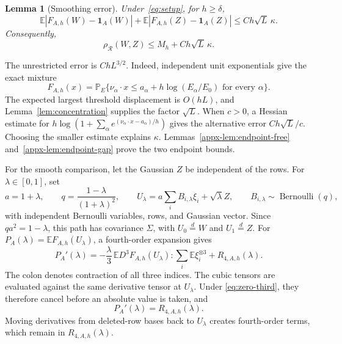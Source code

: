 \documentclass[11pt,letterpaper]{article}
\newtheorem{lemma}{Lemma}
\theoremstyle{remark}
\newcommand{\E}{\mathbb E}
\newcommand{\Pp}{\mathbb P}
\newcommand{\rh}{\rho_{\mathcal R}}
\newcommand{\ind}{\mathbf 1}
\begin{document}
\begin{lemma}[Smoothing error]\label{lem:endpoint}
Under~\eqref{eq:setup}, for \(h\ge\delta\),
\begin{equation}
 \E|F_{A,h}(W)-\ind_A(W)|+
 \E|F_{A,h}(Z)-\ind_A(Z)|\le Ch\sqrt L\,\kappa.
 \label{eq:endpoint-error}
\end{equation}
Consequently,
\begin{equation}
 \rh(W,Z)\le M_h+Ch\sqrt L\,\kappa.
 \label{eq:endpoint-min}
\end{equation}
\end{lemma}
The unrestricted error is \(ChL^{3/2}\). Indeed, independent unit
exponentials give the exact mixture
\[
 F_{A,h}(x)=\Pp_E\{\nu_\alpha\cdot x\le
 a_\alpha+h\log(E_\alpha/E_0)\text{ for every }\alpha\}.
\]
The expected largest threshold displacement is \(O(hL)\), and
Lemma~\ref{lem:concentration} supplies the factor \(\sqrt L\).
When \(c>0\), a Hessian estimate for
\(h\log(1+\sum_\alpha e^{(\nu_\alpha\cdot x-a_\alpha)/h})\)
gives the alternative error \(Ch\sqrt L/c\). Choosing the smaller
estimate explains \(\kappa\). Lemmas~\ref{appx-lem:endpoint-free}
and~\ref{appx-lem:endpoint-gap} prove the two endpoint bounds.

For the smooth comparison, let the Gaussian \(Z\) be independent of
the rows. For \(\lambda\in[0,1]\), set
\begin{equation}
 a=1+\lambda,\qquad q=\frac{1-\lambda}{(1+\lambda)^2},\qquad
 U_\lambda=a\sum_i B_{i,\lambda}\xi_i+\sqrt\lambda Z,
 \qquad B_{i,\lambda}\sim\operatorname{Bernoulli}(q),
 \label{eq:path}
\end{equation}
with independent Bernoulli variables, rows, and Gaussian vector.
Since \(qa^2=1-\lambda\), this path has covariance \(\Sigma\),
with \(U_0\stackrel d=W\) and \(U_1\stackrel d=Z\).
For \(P_A(\lambda)=\E F_{A,h}(U_\lambda)\), a fourth-order expansion gives
\begin{equation}
 P_A'(\lambda)=-\frac\lambda3\,
 \E D^3F_{A,h}(U_\lambda):\sum_i\E\xi_i^{\otimes3}
 +R_{4,A,h}(\lambda).
 \label{eq:path-summary}
\end{equation}
The colon denotes contraction of all three indices. The cubic tensors
are evaluated against the same derivative tensor at \(U_\lambda\).
Under \eqref{eq:zero-third}, they therefore cancel before an absolute
value is taken, and
\begin{equation}
 P_A'(\lambda)=R_{4,A,h}(\lambda).
 \label{zs:identity}
\end{equation}
Moving derivatives from deleted-row bases back to \(U_\lambda\)
creates fourth-order terms, which remain in \(R_{4,A,h}(\lambda)\).
\end{document}
